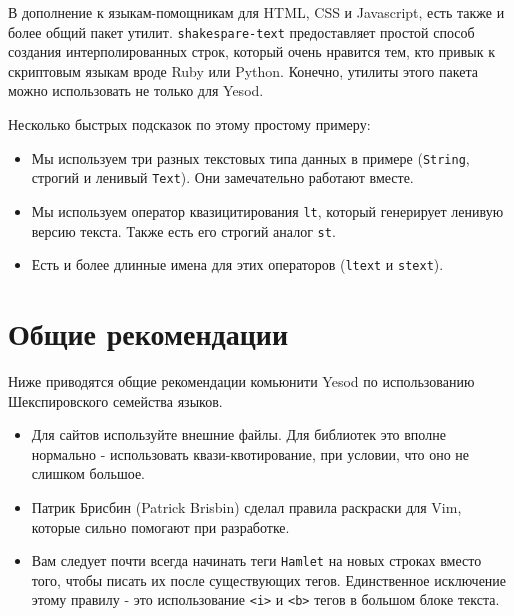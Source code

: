 В дополнение к языкам-помощникам для HTML, CSS и
Javascript, есть также и более общий пакет утилит.
\lstinline!shakespare-text! предоставляет простой способ создания
интерполированных строк, который очень нравится тем, кто привык к скриптовым
языкам вроде Ruby или Python. Конечно, утилиты этого пакета можно использовать
не только для Yesod.

Несколько быстрых подсказок по этому простому примеру:
\begin{itemize}
    \item Мы используем три разных текстовых типа данных в примере
        (\lstinline!String!, строгий и ленивый \lstinline!Text!). Они
        замечательно работают вместе.
    \item Мы используем оператор квазицитирования \lstinline!lt!, который
        генерирует ленивую версию текста. Также есть его строгий аналог
        \lstinline!st!.
    \item Есть и более длинные имена для этих операторов (\lstinline!ltext! и
        \lstinline!stext!).
\end{itemize}

\section{Общие рекомендации}

Ниже приводятся общие рекомендации комьюнити Yesod по использованию
Шекспировского семейства языков.

\begin{itemize}
    \item Для сайтов используйте внешние файлы. Для библиотек это вполне
        нормально - использовать квази-квотирование, при условии, что оно не
        слишком большое.
    \item Патрик Брисбин (Patrick Brisbin) сделал правила раскраски для Vim,
        которые сильно помогают при разработке.
    \item Вам следует почти всегда начинать теги \texttt{Hamlet} на новых
        строках вместо того, чтобы писать их после существующих тегов.
        Единственное исключение этому правилу - это использование
        \lstinline!<i>! и \lstinline!<b>! тегов в большом блоке текста.
\end{itemize}
